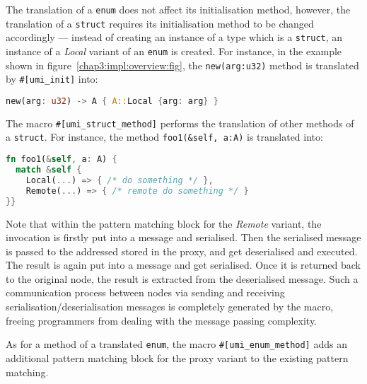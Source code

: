 The translation of a \texttt{enum} does not affect its initialisation method, however, the translation of a \texttt{struct} requires its initialisation method to be changed accordingly --- instead of creating an instance of a type which is a \texttt{struct}, an instance of a \textit{Local} variant of an \texttt{enum} is created. For instance, in the example shown in figure~\ref{chap3:impl:overview:fig}, the \texttt{new(arg:u32)} method is translated by \texttt{\#[umi\_init]} into:
\begin{lstlisting}[language=Rust, style=boxed, basicstyle=\footnotesize\ttfamily]
new(arg: u32) -> A { A::Local {arg: arg} }
\end{lstlisting}

The macro \texttt{\#[umi\_struct\_method]} performs the translation of other methods of a \texttt{struct}. For instance, the method \texttt{foo1(\&self, a:A)} is translated into:
\begin{lstlisting}[language=Rust, style=boxed, basicstyle=\footnotesize\ttfamily]
fn foo1(&self, a: A) {
  match &self {
    Local(...) => { /* do something */ },
    Remote(...) => { /* remote do something */ }
}}
\end{lstlisting}
Note that within the pattern matching block for the \emph{Remote} variant, the invocation is firstly put into a message and serialised. Then the serialised message is passed to the addressed stored in the proxy, and get deserialised and executed. The result is again put into a message and get serialised. Once it is returned back to the original node, the result is extracted from the deserialised message. Such a communication process between nodes via sending and receiving serialisation/deserialisation messages is completely generated by the macro, freeing programmers from dealing with the message passing complexity.

As for a method of a translated \texttt{enum}, the macro \texttt{\#[umi\_enum\_method]} adds an additional pattern matching block for the proxy variant to the existing pattern matching.

